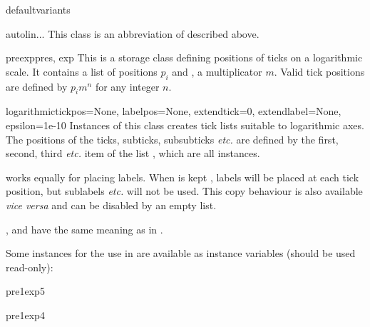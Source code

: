\begin{memberdesc}{defaultvariants}
\end{memberdesc}

\begin{classdesc}{autolin}{...}
This class is an abbreviation of  described above.
\end{classdesc}

\begin{classdesc}{preexp}{pres, exp}
  This is a storage class defining positions of ticks on a
  logarithmic scale. It contains a list  of positions $p_i$
  and , a multiplicator $m$. Valid tick positions are defined
  by $p_im^n$ for any integer $n$.
\end{classdesc}

\begin{classdesc}{logarithmic}{tickpos=None, labelpos=None,
                               extendtick=0, extendlabel=None,
                               epsilon=1e-10}
  Instances of this class creates tick lists suitable to logarithmic
  axes. The positions of the ticks, subticks, subsubticks \emph{etc.}
  are defined by the first, second, third \emph{etc.} item of the list
  , which are all  instances.

   works equally for placing labels. When 
  is kept , labels will be placed at each tick position,
  but sublabels \emph{etc.} will not be used. This copy behaviour is
  also available \emph{vice versa} and can be disabled by an empty
  list.

  ,  and  have the same
  meaning as in .
\end{classdesc}

Some  instances for the use in  are
available as instance variables (should be used read-only):

\begin{memberdesc}{pre1exp5}
\end{memberdesc}

\begin{memberdesc}{pre1exp4}
\end{memberdesc}

